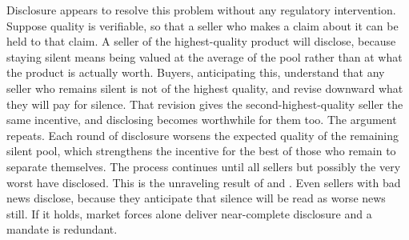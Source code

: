 Disclosure appears to resolve this problem without any regulatory intervention. Suppose quality
is verifiable, so that a seller who makes a claim about it can be held to that claim. A seller
of the highest-quality product will disclose, because staying silent means being valued at the
average of the pool rather than at what the product is actually worth. Buyers, anticipating
this, understand that any seller who remains silent is not of the highest quality, and revise
downward what they will pay for silence. That revision gives the second-highest-quality seller
the same incentive, and disclosing becomes worthwhile for them too. The argument repeats. Each
round of disclosure worsens the expected quality of the remaining silent pool, which strengthens
the incentive for the best of those who remain to separate themselves. The process continues
until all sellers but possibly the very worst have disclosed. This is the unraveling result of
\citet{grossman_informational_1981} and \citet{milgrom_good_1981}. Even sellers with bad news
disclose, because they anticipate that silence will be read as worse news still. If it holds,
market forces alone deliver near-complete disclosure and a mandate is redundant.
